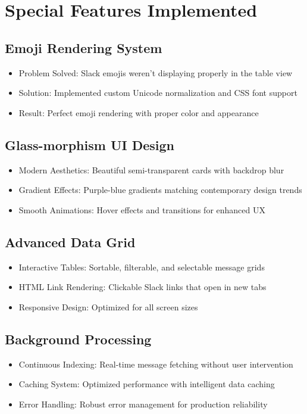 \documentclass[12pt,a4paper]{article}
\begin{document}
\section{Special Features Implemented}
\subsection{Emoji Rendering System}
\begin{itemize}
    \item Problem Solved: Slack emojis weren't displaying properly in the table view
    \item Solution: Implemented custom Unicode normalization and CSS font support
    \item Result: Perfect emoji rendering with proper color and appearance
\end{itemize}
\subsection{Glass-morphism UI Design}
\begin{itemize}
    \item Modern Aesthetics: Beautiful semi-transparent cards with backdrop blur
    \item Gradient Effects: Purple-blue gradients matching contemporary design trends
    \item Smooth Animations: Hover effects and transitions for enhanced UX
\end{itemize}
\subsection{Advanced Data Grid}
\begin{itemize}
    \item Interactive Tables: Sortable, filterable, and selectable message grids
    \item HTML Link Rendering: Clickable Slack links that open in new tabs
    \item Responsive Design: Optimized for all screen sizes
\end{itemize}
\subsection{Background Processing}
\begin{itemize}
    \item Continuous Indexing: Real-time message fetching without user intervention
    \item Caching System: Optimized performance with intelligent data caching
    \item Error Handling: Robust error management for production reliability
\end{itemize}
\end{document}
